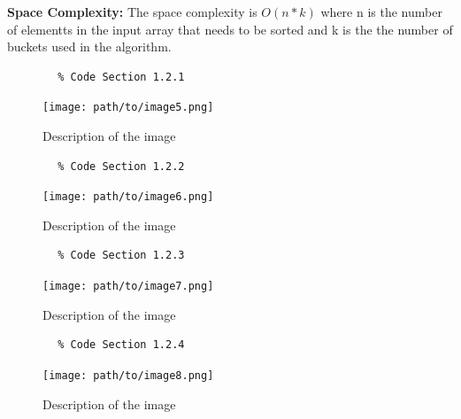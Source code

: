 \documentclass{article}
\begin{document}
\begin{enumerate}
\begin{enumerate}[label*=\arabic*.]
        \textbf{Space Complexity: } The space complexity is \( O(n * k) \) where n is the number of elementts in the input array that needs to be sorted and k is the the number of buckets used in the algorithm. 

        \begin{verbatim}
        % Code Section 1.2.1
        \end{verbatim}

        \begin{figure}[h]
            \centering
            \texttt{[image: path/to/image5.png]}
            \caption{Description of the image}
            \label{fig:image5}
        \end{figure}

        \begin{verbatim}
        % Code Section 1.2.2
        \end{verbatim}

        \begin{figure}[h]
            \centering
            \texttt{[image: path/to/image6.png]}
            \caption{Description of the image}
            \label{fig:image6}
        \end{figure}

        \begin{verbatim}
        % Code Section 1.2.3
        \end{verbatim}

        \begin{figure}[h]
            \centering
            \texttt{[image: path/to/image7.png]}
            \caption{Description of the image}
            \label{fig:image7}
        \end{figure}

        \begin{verbatim}
        % Code Section 1.2.4
        \end{verbatim}

        \begin{figure}[h]
            \centering
            \texttt{[image: path/to/image8.png]}
            \caption{Description of the image}
            \label{fig:image8}
        \end{figure}

       




\end{enumerate}
\end{enumerate}
\end{document}
